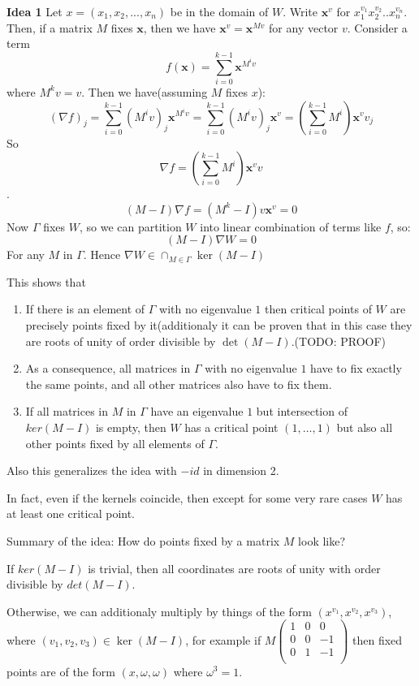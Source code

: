 \documentclass[a4paper]{article}
\begin{document}
\textbf{Idea 1}
Let $x = (x_1, x_2, ..., x_n)$ be in the domain of $W$.
Write $\textbf{x}^v$ for $x_1^{v_1} x_2^{v_2} .. x_n^{v_n}$. Then, if a matrix $M$ fixes $\textbf{x}$, then we have $\textbf{x}^v = \textbf{x}^{Mv}$ for any vector $v$.
Consider a term 
$$f(\textbf{x}) = \sum_{i=0}^{k-1} \textbf{x}^{M^i v}$$
where $M^k v =v$.
Then we have(assuming $M$ fixes $x$):
$$(\nabla f)_j = \sum_{i=0}^{k-1} (M^i v)_j \textbf{x}^{M^i v} = \sum_{i=0}^{k-1} (M^i v)_j \textbf{x}^{v} = (\sum_{i=0}^{k-1} M^i) \textbf{x}^{v} v_j$$
So $$\nabla f = (\sum_{i=0}^{k-1} M^i) \textbf{x}^{v} v$$.
$$(M-I)\nabla f= (M^k-I)v \textbf{x}^{v}= 0$$
Now $\Gamma$ fixes $W$, so we can partition $W$ into linear combination of terms like $f$, so:
$$(M-I)\nabla W = 0$$
For any $M$ in $\Gamma$.
Hence $\nabla W \in \cap_{M \in \Gamma} \ker(M - I)$

This shows that 
\begin{enumerate}
	\item If there is an element of $\Gamma$ with no eigenvalue $1$ then critical points of $W$ are precisely points fixed by it(additionaly it can be proven that in this case they are roots of unity of order divisible by $\det(M-I)$.(TODO: PROOF)
	\item As a consequence, all matrices in $\Gamma$ with no eigenvalue $1$ have to fix exactly the same points, and all other matrices also have to fix them.
	\item If all matrices in $M$ in $\Gamma$ have an eigenvalue $1$ but intersection of $ker(M-I)$ is empty, then $W$ has a critical point $(1, \dots,1)$ but also all other points fixed by all elements of $\Gamma$.
\end{enumerate}

Also this generalizes the idea with $-id$ in dimension 2. 

In fact, even if the kernels coincide, then except for some very rare cases $W$ has at least one critical point.

Summary of the idea:
How do points fixed by a matrix $M$ look like?

If $ker(M-I)$ is trivial, then all coordinates are roots of unity with order divisible by $det(M-I)$.

Otherwise, we can additionaly multiply by things of the form $(x^{v_1}, x^{v_2}, x^{v_3})$, where $(v_1, v_2, v_3) \in \ker(M-I)$, for example if $ M\begin{pmatrix}
1 & 0 &0 \\ 
0 & 0 & -1\\
0 & 1 & -1\\
\end{pmatrix}$ then fixed points are of the form $(x, \omega, \omega)$ where $\omega^3 = 1$.
\end{document}
